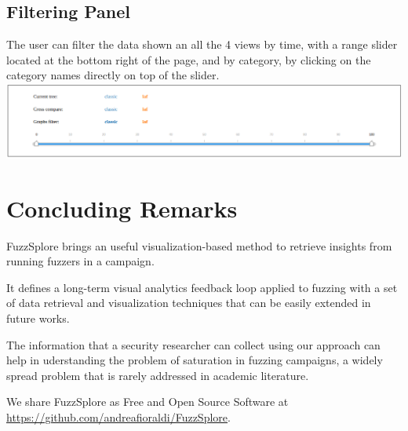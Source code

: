 \documentclass[conference,compsoc]{IEEEtran}
\begin{document}
\subsection{Filtering Panel}
The user can filter the data shown an all the 4 views by time, with a range slider located at the bottom right of the page, and by category, by clicking on the category names directly on top of the slider.
\includegraphics[scale=0.3]{img/panel}



\section{Concluding Remarks}

{\sc FuzzSplore} brings an useful visualization-based method to retrieve insights from running fuzzers in a campaign. 

It defines a long-term visual analytics feedback loop applied to fuzzing with a set of data retrieval and visualization techniques that can be easily extended in future works. 

The information that a security researcher can collect using our approach can help in uderstanding the problem of saturation in fuzzing campaigns, a widely spread problem that is rarely addressed in academic literature.

We share {\sc FuzzSplore} as Free and Open Source Software at \url{https://github.com/andreafioraldi/FuzzSplore}.



\end{document}
